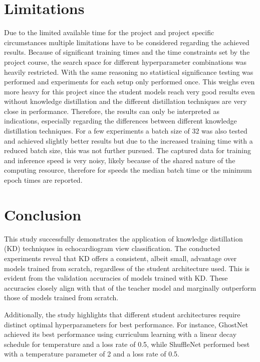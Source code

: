 \documentclass[12pt]{article}
\begin{document}
\section{Limitations}
Due to the limited available time for the project and project specific circumstances multiple limitations have to be considered regarding the achieved results. Because of significant training times and the time constraints set by the project course, the search space for different hyperparameter combinations was heavily restricted. With the same reasoning no statistical significance testing was performed and experiments for each setup only performed once. This weighs even more heavy for this project since the student models reach very good results even without knowledge distillation and the different distillation techniques are very close in performance. Therefore, the results can only be interpreted as indications, especially regarding the differences between different knowledge distillation techniques.
For a few experiments a batch size of $ 32 $ was also tested and achieved slightly better results but due to the increased training time with a reduced batch size, this was not further pursued.
The captured data for training and inference speed is very noisy, likely because of the shared nature of the computing resource, therefore for speeds the median batch time or the minimum epoch times are reported.

\section{Conclusion}

This study successfully demonstrates the application of knowledge distillation (KD) techniques in echocardiogram view classification. The conducted experiments reveal that KD offers a consistent, albeit small, advantage over models trained from scratch, regardless of the student architecture used. This is evident from the validation accuracies of models trained with KD. These accuracies closely align with that of the teacher model and marginally outperform those of models trained from scratch.

Additionally, the study highlights that different student architectures require distinct optimal hyperparameters for best performance. For instance, GhostNet achieved its best performance using curriculum learning with a linear decay schedule for temperature and a loss rate of 0.5, while ShuffleNet performed best with a temperature parameter of 2 and a loss rate of 0.5.
\end{document}
